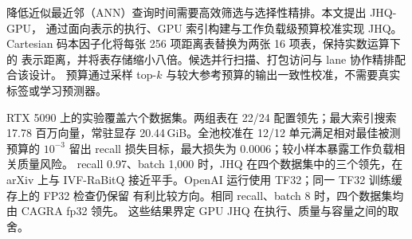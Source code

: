 降低近似最近邻（ANN）查询时间需要高效筛选与选择性精排。本文提出 JHQ-GPU，
通过面向表示的执行、GPU 索引构建与工作负载级预算校准实现 JHQ。
Cartesian 码本因子化将每张 256 项距离表替换为两张 16 项表，保持实数运算下的
表示距离，并将表存储缩小八倍。候选并行扫描、打包访问与 lane 协作精排配合该设计。
预算通过采样 top-$k$ 与较大参考预算的输出一致性校准，不需要真实标签或学习预测器。

RTX 5090 上的实验覆盖六个数据集。两组表在 22/24 配置领先；最大索引搜索
17.78 百万向量，常驻显存 20.44\,GiB。全池校准在 12/12 单元满足相对最佳被测预算的
$10^{-3}$ 留出 recall 损失目标，最大损失为 0.0006；较小样本暴露工作负载相关质量风险。
recall 0.97、batch 1,000 时，JHQ 在四个数据集中的三个领先，在 arXiv 上与
IVF-RaBitQ 接近平手。OpenAI 运行使用 TF32；同一 TF32 训练缓存上的 FP32 检查仍保留
有利比较方向。相同 recall、batch 8 时，四个数据集均由 CAGRA fp32 领先。
这些结果界定 GPU JHQ 在执行、质量与容量之间的取舍。
